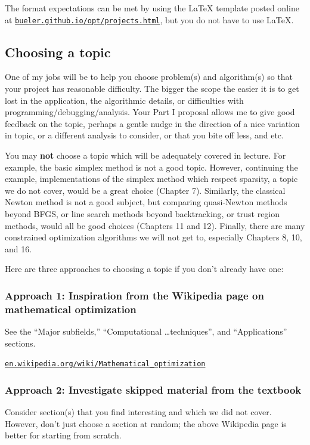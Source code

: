 \documentclass[12pt]{amsart}
\begin{document}
The format expectations can be met by using the \LaTeX\xspace template posted online at \href{https://bueler.github.io/opt/projects.html}{\texttt{bueler.github.io/opt/projects.html}}, but you do not have to use \LaTeX.


\subsection*{Choosing a topic}  One of my jobs will be to help you choose problem(s) and algorithm(s) so that your project has reasonable difficulty.  The bigger the scope the easier it is to get lost in the application, the algorithmic details, or difficulties with programming/debugging/analysis.  Your Part I proposal allows me to give good feedback on the topic, perhaps a gentle nudge in the direction of a nice variation in topic, or a different analysis to consider, or that you bite off less, and etc.

You may \textbf{not} choose a topic which will be adequately covered in lecture.  For example, the basic simplex method is not a good topic.  However, continuing the example, implementations of the simplex method which respect sparsity, a topic we do not cover, would be a great choice (Chapter 7).  Similarly, the classical Newton method is not a good subject, but comparing quasi-Newton methods beyond BFGS, or line search methods beyond backtracking, or trust region methods, would all be good choices (Chapters 11 and 12).  Finally, there are many constrained optimization algorithms we will not get to, especially Chapters 8, 10, and 16. 

Here are three approaches to choosing a topic if you don't already have one:

\subsubsection*{Approach 1: Inspiration from the Wikipedia page on mathematical optimization}

See the ``Major subfields,'' ``Computational \dots techniques'', and ``Applications'' sections.

   \centerline{\href{https://en.wikipedia.org/wiki/Mathematical_optimization}{\texttt{en.wikipedia.org/wiki/Mathematical\_optimization}}}

\subsubsection*{Approach 2: Investigate skipped material from the textbook}  Consider section(s) that you find interesting and which we did not cover.  However, don't just choose a section at random; the above Wikipedia page is better for starting from scratch.
\end{document}
